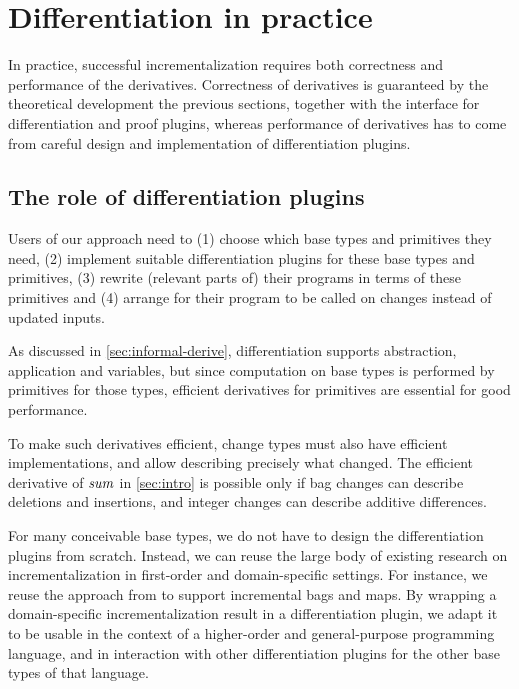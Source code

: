 \chapter{Differentiation in practice}
\label{sec:applying}

In practice, successful incrementalization requires both
correctness and performance of the derivatives. Correctness of
derivatives is guaranteed by the theoretical development the
previous sections, together with the interface for
differentiation and proof plugins, whereas performance of
derivatives has to come from careful design and implementation of
differentiation plugins.

\section{The role of differentiation plugins}
\label{ssec:methodology}
Users of our approach need to
%
(1) choose which base types and primitives they need,
%
(2) implement suitable differentiation plugins for these base
types and primitives,
%
(3) rewrite (relevant parts of) their programs in terms of these primitives and
%
(4) arrange for their program to be called on changes instead of
updated inputs.

As discussed in \cref{sec:informal-derive}, differentiation
supports abstraction, application and variables, but since
computation on base types is performed by primitives for those
types, efficient derivatives for primitives are essential for
good performance.

To make such derivatives efficient, change
types must also have efficient implementations, and allow
describing precisely what changed. The efficient derivative of
$\mathit{sum}$ in \cref{sec:intro} is possible only if bag changes
can describe deletions and insertions, and integer changes can
describe additive differences.

For many conceivable base types, we do not have to design the
differentiation plugins from scratch. Instead, we can reuse the
large body of existing research on incrementalization in
first-order and domain-specific settings. For instance, we reuse
the approach from \citet{GlucheGrust97Incr} to support incremental
bags and maps. By wrapping a
domain-specific incrementalization result in a differentiation
plugin, we adapt it to be usable in the context of a higher-order
and general-purpose programming language, and in interaction with
other differentiation plugins for the other base types of that
language.

